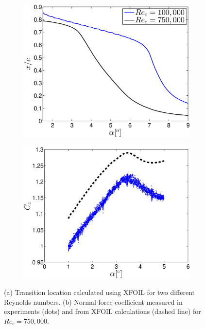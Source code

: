 \begin{figure}[!h]
	\centering
	\begin{subfigure}[t]{0.45\textwidth}
		\caption{}
		\includegraphics[width=1\textwidth]{tr_xfoil_100_750}
		\label{fig:tr_xfoil_100_750}		
	\end{subfigure}
	\begin{subfigure}[t]{0.45\textwidth}
		\caption{}
		\includegraphics[width=1\textwidth]{765k_static_model_cz_xfoil}
		\label{fig:765k_static_cz_foil}
	\end{subfigure}
	\caption{(a) Transition location calculated using XFOIL for two different Reynolds numbers. (b) Normal force coefficient measured in experiments (dots) and from XFOIL calculations (dashed line) for $Re_{c}=750,000$.}		
\end{figure}
